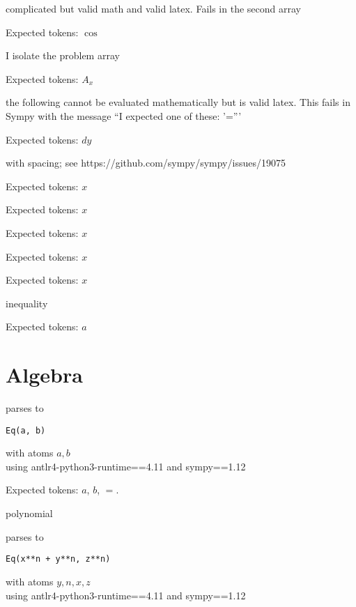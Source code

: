 \documentclass{article}
\begin{document}
complicated but valid math and valid latex. Fails in the second array  

Expected tokens: $\cos$

\hrulefill

I isolate the problem array

Expected tokens: $A_{x}$

\hrulefill

the following cannot be evaluated mathematically but is valid latex. 
This fails in Sympy with the message ``I expected one of these: '='''

Expected tokens: $dy$

\hrulefill

with spacing; see https://github.com/sympy/sympy/issues/19075

Expected tokens: $x$

\hrulefill


Expected tokens: $x$

\hrulefill


Expected tokens: $x$

\hrulefill


Expected tokens: $x$

\hrulefill


Expected tokens: $x$

\hrulefill

inequality

Expected tokens: $a$

\hrulefill

\section{Algebra}

\hrulefill


parses to 
\begin{verbatim}
Eq(a, b)    
\end{verbatim}
with atoms ${a, b}$\\
using antlr4-python3-runtime==4.11 and sympy==1.12

Expected tokens: $a$, $b$, $=$.

\hrulefill

polynomial
    
parses to
\begin{verbatim}
Eq(x**n + y**n, z**n)
\end{verbatim}
with atoms ${y, n, x, z}$\\
using antlr4-python3-runtime==4.11 and sympy==1.12
\end{document}
